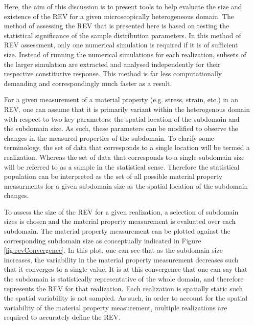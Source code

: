 Here, the aim of this discussion is to present tools to help evaluate the size and existence of the REV for a given microscopically heterogeneous domain. The method of assessing the REV that is presented here is based on testing the statistical significance of the sample distribution parameters. In this method of REV assessment, only one numerical simulation is required if it is of sufficient size. Instead of running the numerical simulations for each realization, subsets of the larger simulation are extracted and analysed independently for their respective constitutive response. This method is far less computationally demanding and correspondingly much faster as a result. 

For a given measurement of a material property (e.g. stress, strain, etc.) in an REV, one can assume that it is primarily variant within the heterogenous domain with respect to two key parameters: the spatial location of the subdomain and the subdomain size. As such, these parameters can be modified to observe the changes in the measured properties of the subdomain. To clarify some terminology, the set of data that corresponds to a single location will be termed a realization. Whereas the set of data that corresponds to a single subdomain size will be referred to as a sample in the statistical sense. Therefore the statistical population can be interpreted as the set of all possible material property measurments for a given subdomain size as the spatial location of the subdomain changes. 

To assess the size of the REV for a given realization, a selection of subdomain sizes is chosen and the material property measurement is evaluated over each subdomain. The material property measurement can be plotted against the corresponding subdomain size as conceptually indicated in Figure \ref{fig:revConvergence}. In this plot, one can see that as the subdomain size increases, the variability in the material property measurement decreases such that it converges to a single value. It is at this convergence that one can say that the subdomain is statistically representative of the whole domain, and therefore represents the REV for that realization. Each realization is spatially static such the spatial variability is not sampled. As such, in order to account for the spatial variability of the material property measurement, multiple realizations are required to accurately define the REV.

